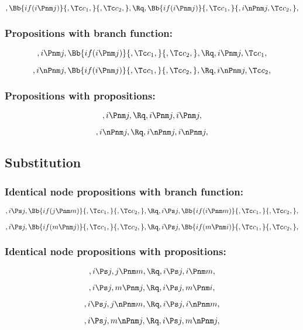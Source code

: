 \[, \Bb{if(i \Pnm j)}{,\Tc c_1,}{,\Tc c_2,}, \Rq , \Bb{if(i \Pnm j)}{,\Tc c_1,}{,i \nPnm j,\Tc c_2,},\]

\bigskip
\bigskip
\bigskip
\bigskip
\subsubsection{Propositions with branch function:}
\[,i \Pnm j, \Bb{if(i \Pnm j)}{,\Tc c_1,}{,\Tc c_2,}, \Rq , i \Pnm j, \Tc c_1,\]

\[,i \nPnm j, \Bb{if(i \Pnm j)}{,\Tc c_1,}{,\Tc c_2,}, \Rq , i \nPnm j, \Tc c_2,\]


\bigskip
\bigskip
\bigskip
\bigskip
\subsubsection{Propositions with propositions:}
\[,i \Pnm j, \Rq , i \Pnm j, i \Pnm j,\]

\[,i \nPnm j, \Rq , i \nPnm j, i \nPnm j,\]





\bigskip
\bigskip
\bigskip
\bigskip
\subsection{ Substitution}
\subsubsection{Identical node propositions with  branch function:}
\[,i \Ps j, \Bb{if(j \Pnm m)}{,\Tc c_1,}{,\Tc c_2,}, \Rq ,i \Ps j, \Bb{if(i \Pnm m)}{,\Tc c_1,}{,\Tc c_2,}, \]


\bigskip
\bigskip
\bigskip
\bigskip
\[,i \Ps j, \Bb{if(m \Pnm j)}{,\Tc c_1,}{,\Tc c_2,}, \Rq ,i \Ps j, \Bb{if(m \Pnm i)}{,\Tc c_1,}{,\Tc c_2,}, \]



\bigskip
\bigskip
\bigskip
\bigskip
\subsubsection{Identical node propositions with  propositions:}
\[,i \Ps j, j \Pnm m, \Rq , i \Ps j, i \Pnm m,\]

\[,i \Ps j, m \Pnm j, \Rq , i \Ps j, m \Pnm i,\]

\[,i \Ps j, j \nPnm m, \Rq , i \Ps j, i \nPnm m,\]

\[,i \Ps j, m \nPnm j, \Rq , i \Ps j, m \nPnm j,\]


\bigskip
\bigskip
\bigskip
\bigskip
